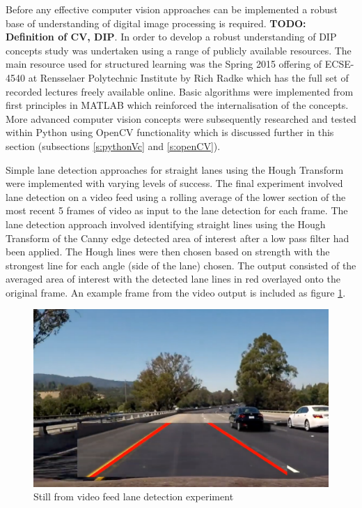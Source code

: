 \documentclass[]{aiaa-tc}%
\begin{document}
Before any effective computer vision approaches can be implemented a robust base of understanding of digital image processing is required. \textbf{TODO: Definition of CV, DIP}. In order to develop a robust understanding of DIP concepts study was undertaken using a range of publicly available resources. The main resource used for structured learning was the Spring 2015 offering of ECSE-4540 at Rensselaer Polytechnic Institute by Rich Radke which has the full set of recorded lectures freely available online. Basic algorithms were implemented from first principles in MATLAB which reinforced the internalisation of the concepts. More advanced computer vision concepts were subsequently researched and tested within Python using OpenCV functionality which is discussed further in this section (subsections \ref{s:pythonVc} and \ref{s:openCV}). 

Simple lane detection approaches for straight lanes using the Hough Transform were implemented with varying levels of success. The final experiment involved lane detection on a video feed using a rolling average of the lower section of the most recent 5 frames of video as input to the lane detection for each frame. The lane detection approach involved identifying straight lines using the Hough Transform of the Canny edge detected area of interest after a low pass filter had been applied. The Hough lines were then chosen based on strength with the strongest line for each angle (side of the lane) chosen. The output consisted of the averaged area of interest with the detected lane lines in red overlayed onto the original frame. An example frame from the video output is included as figure \ref{f:simpleLaneDetectionHough}.

\begin{figure}[htb]%
	\includegraphics{early_lane_detection_experiment.png}
	\caption{Still from video feed lane detection experiment}
	\label{f:simpleLaneDetectionHough}
\end{figure}
\end{document}
